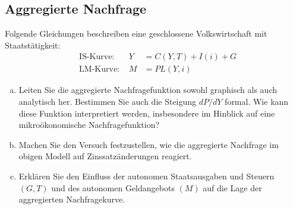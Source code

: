 \documentclass{scrartcl}
\begin{document}
\subsection{Aggregierte Nachfrage}
Folgende Gleichungen beschreiben eine geschlossene Volkswirtschaft mit
Staatst\"{a}tigkeit:
\begin{align*}
  &\text{IS-Kurve: }& Y &= C(Y,T) + I(i) + G\\
  &\text{LM-Kurve: }& M &= P L(Y,i)
\end{align*}
\begin{enumerate}[(a)]
  \item Leiten Sie die aggregierte Nachfragefunktion sowohl graphisch als auch analytisch her. Bestimmen Sie auch die Steigung $dP/dY$ formal. Wie kann diese Funktion interpretiert werden, insbesondere im Hinblick auf eine mikro\"{o}konomische Nachfragefunktion?
  \item Machen Sie den Versuch festzustellen, wie die aggregierte Nachfrage im obigen Modell auf Zinssatz\"{a}nderungen reagiert.
  \item Erkl\"{a}ren Sie den Einfluss der autonomen Staatsausgaben und Steuern $(G,T)$ und des autonomen Geldangebots $(M)$ auf die Lage der aggregierten Nachfragekurve.
\end{enumerate}
\end{document}
